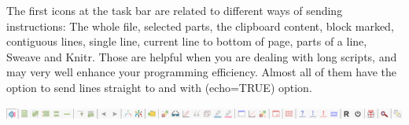 The first icons at the \RR{} task bar are related to different ways of sending instructions:
The whole file, selected parts, the clipboard content, block marked, contiguous lines, single line,
current line to bottom of page, parts of a line, Sweave and Knitr.
Those are helpful when you are dealing with long scripts,
and may very well enhance your programming efficiency.
Almost all of them have the option to send lines straight to \RR{} and with (echo=TRUE) option.

\vspace{5mm}
\includegraphics[width=\headwidth]{./res/secrets_rtoolbar.png}\\
\vspace{5mm}
